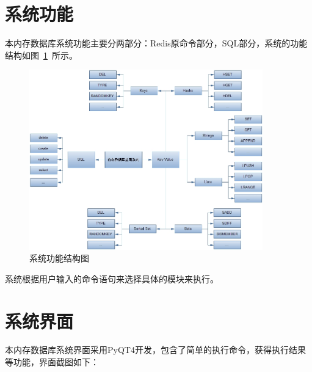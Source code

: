\documentclass{zjutthesis}
\begin{document}
\section{系统功能}
本内存数据库系统功能主要分两部分：Redis原命令部分，SQL部分，系统的功能结构如图~\ref{fig:Command}~所示。
\begin{figure}[H]
\centering
\includegraphics[width=0.9\textwidth]{Command}
\caption{系统功能结构图}\label{fig:Command}
\vspace{\baselineskip} %
\end{figure}
系统根据用户输入的命令语句来选择具体的模块来执行。

\section{系统界面}
本内存数据库系统界面采用PyQT4开发，包含了简单的执行命令，获得执行结果等功能，界面截图如下：
\end{document}
